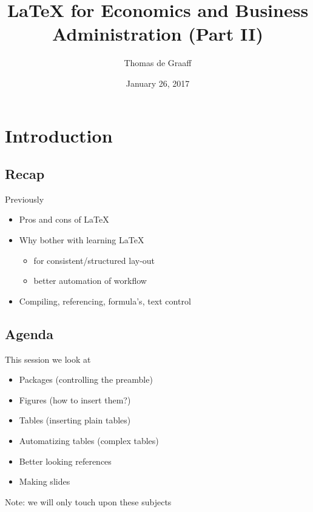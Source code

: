 \documentclass[ignorenonframetext]{beamer}
\title{\LaTeX{} for Economics and Business Administration (Part II)}
\author{Thomas de Graaff}
\date{January 26, 2017}
\begin{document}
\frame{\titlepage}

\section{Introduction}\label{introduction}

\subsection{Recap}\label{introduction-1}

\begin{frame}{Previously}
	\begin{itemize}
		\item Pros and cons of \LaTeX{}
		\newline
		\item Why bother with learning \LaTeX{}
		\begin{itemize}
			\item for consistent/structured lay-out
			\item better automation of workflow
			\newline
		\end{itemize}
		\item Compiling, referencing, formula's, text control
	\end{itemize}
\end{frame}

\subsection{Agenda}

\begin{frame}{This session we look at}
\begin{itemize}
	\item Packages (controlling the preamble)
	\newline
	\item Figures (how to insert them?)
	\newline
	\item Tables (inserting plain tables)
	\newline
	\item Automatizing tables (complex tables)
	\newline
	\item Better looking references
	\newline
	\item Making slides
	\newline
\end{itemize}
	Note: we will only touch upon these subjects
\end{frame}
\end{document}
